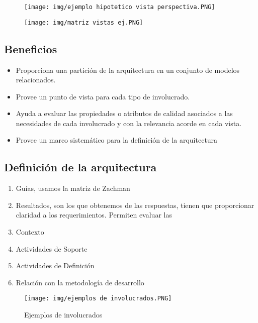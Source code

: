 \begin{figure}[!htb]
    \centering
    \texttt{[image: img/ejemplo hipotetico vista perspectiva.PNG]}
\end{figure}

\begin{figure}[!htb]
    \centering
    \texttt{[image: img/matriz vistas ej.PNG]}
\end{figure}

\newpage
\subsection*{Beneficios}

\begin{itemize}
\item Proporciona una partición de la arquitectura en un conjunto de modelos relacionados.
\item Provee un punto de vista para cada tipo de involucrado.
\item Ayuda a evaluar las propiedades o atributos de calidad asociados a las necesidades de cada involucrado y con la relevancia acorde en cada vista.
\item Provee un marco sistemático para la definición de la arquitectura
\end{itemize}


\subsection*{Definición de la arquitectura}

\begin{enumerate}
\item Guías, usamos la matriz de Zachman
\item Resultados, son los que obtenemos de las respuestas, tienen que proporcionar claridad a los requerimientos. Permiten evaluar las 
\item Contexto
\item Actividades de Soporte
\item Actividades de Definición
\item Relación con la metodología de desarrollo
\end{enumerate}


\begin{figure}[!htb]
    \centering
    \texttt{[image: img/ejemplos de involucrados.PNG]}
    \caption{Ejemplos de involucrados}
\end{figure}


